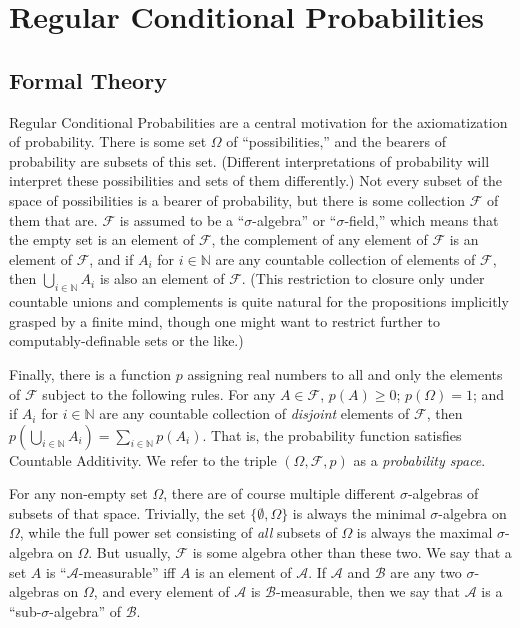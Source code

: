 \section{Regular Conditional Probabilities}\label{regular}

\subsection{Formal Theory}\label{formal}

Regular Conditional Probabilities are a central motivation for the \citet{kolmogorov} axiomatization of probability. There is some set $\Omega$ of ``possibilities,'' and the bearers of probability are subsets of this set. (Different interpretations of probability will interpret these possibilities and sets of them differently.) Not every subset of the space of possibilities is a bearer of probability, but there is some collection $\mathcal{F}$ of them that are. $\mathcal{F}$ is assumed to be a ``$\sigma$-algebra'' or ``$\sigma$-field,'' which means that the empty set is an element of $\mathcal{F}$, the complement of any element of $\mathcal{F}$ is an element of $\mathcal{F}$, and if $A_i$ for $i\in\mathbb{N}$ are any countable collection of elements of $\mathcal{F}$, then $\bigcup_{i\in\mathbb{N}}A_i$ is also an element of $\mathcal{F}$. (This restriction to closure only under countable unions and complements is quite natural for the propositions implicitly grasped by a finite mind, though one might want to restrict further to computably-definable sets or the like.)

Finally, there is a function $p$ assigning real numbers to all and only the elements of $\mathcal{F}$ subject to the following rules. For any $A\in\mathcal{F}$, $p(A)\geq 0$; $p(\Omega)=1$; and if $A_i$ for $i\in\mathbb{N}$ are any countable collection of \emph{disjoint} elements of $\mathcal{F}$, then $p(\bigcup_{i\in\mathbb{N}}A_i)=\sum_{i\in\mathbb{N}}p(A_i)$. That is, the probability function satisfies Countable Additivity. We refer to the triple $(\Omega,\mathcal{F},p)$ as a \textit{probability space}.

For any non-empty set $\Omega$, there are of course multiple different $\sigma$-algebras of subsets of that space. Trivially, the set $\{\emptyset,\Omega\}$ is always the minimal $\sigma$-algebra on $\Omega$, while the full power set consisting of \emph{all} subsets of $\Omega$ is always the maximal $\sigma$-algebra on $\Omega$. But usually, $\mathcal{F}$ is some algebra other than these two. We say that a set $A$ is ``$\mathcal{A}$-measurable'' iff $A$ is an element of $\mathcal{A}$. If $\mathcal{A}$ and $\mathcal{B}$ are any two $\sigma$-algebras on $\Omega$, and every element of $\mathcal{A}$ is $\mathcal{B}$-measurable, then we say that $\mathcal{A}$ is a ``sub-$\sigma$-algebra'' of $\mathcal{B}$.

